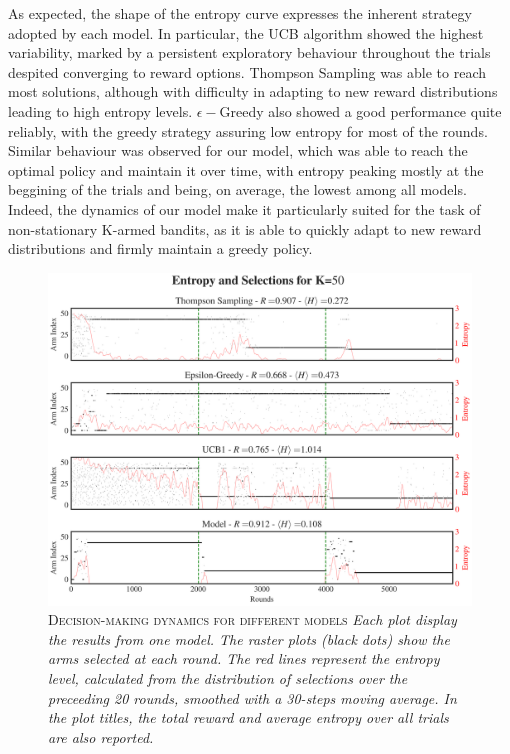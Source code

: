 As expected, the shape of the entropy curve expresses the inherent strategy adopted by each model.
In particular, the UCB algorithm showed the highest variability, marked by a persistent exploratory behaviour throughout the trials despited converging to reward options. Thompson Sampling was able to reach most solutions, although with difficulty in adapting to new reward distributions
leading to high entropy levels.
$\epsilon-$Greedy also showed a good performance quite reliably, with the greedy strategy assuring low entropy for most of the rounds.
Similar behaviour was observed for our model, which was able to reach the optimal policy and maintain it over time, with entropy peaking mostly at the beggining of the trials and being, on average, the lowest among all models.
Indeed, the dynamics of our model make it particularly suited for the task of non-stationary K-armed bandits, as it is able to quickly adapt to new reward distributions and firmly maintain a greedy policy.

\begin{figure}[H]
    \centering
    \includegraphics[width=1.0\textwidth]{figures/performance_analysis_KABv0.png}
    \caption{\textsc{Decision-making dynamics for different models} \textit{Each plot display the results from one model. The raster plots (black dots) show the arms selected at each round.
The red lines represent the entropy level, calculated from the distribution of selections over the preceeding 20 rounds, smoothed with a 30-steps moving average. In the plot titles, the total reward and average entropy over all trials are also reported.}}
    \label{fig:entropy_fig1}
\end{figure}


